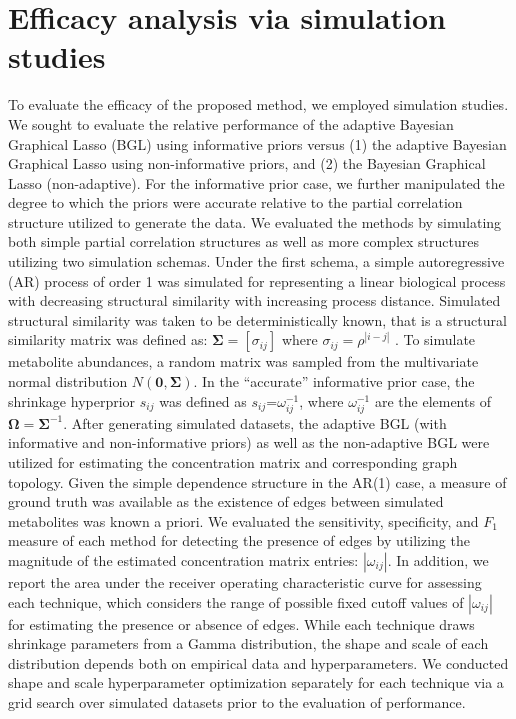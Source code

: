 \section{Efficacy analysis via simulation studies}
To evaluate the efficacy of the proposed method, we employed simulation studies. We sought to evaluate the relative performance of the adaptive Bayesian Graphical Lasso (BGL) using informative priors versus (1) the adaptive Bayesian Graphical Lasso using non-informative priors, and (2) the Bayesian Graphical Lasso (non-adaptive). For the informative prior case, we further manipulated the degree to which the priors were accurate relative to the partial correlation structure utilized to generate the data. We evaluated the methods by simulating both simple partial correlation structures as well as more complex structures utilizing two simulation schemas. Under the first schema, a simple autoregressive (AR) process of order 1 was simulated for representing a linear biological process with decreasing structural similarity with increasing process distance. Simulated structural similarity was taken to be deterministically known, that is a structural similarity matrix was defined as: $\boldsymbol{\Sigma} = \left[\sigma_{ij}\right]$ where $\sigma_{ij}=\rho^{|i-j|}$ . To simulate metabolite abundances, a random matrix was sampled from the multivariate normal distribution $N(\textbf{0},\boldsymbol{\Sigma})$. In the “accurate” informative prior case, the shrinkage hyperprior $s_{ij}$ was defined as $s_{ij}$=$\omega_{ij}^{-1}$, where $\omega_{ij}^{-1}$ are the elements of $\boldsymbol{\Omega}=\boldsymbol{\Sigma}^{-1}$. After generating simulated datasets, the adaptive BGL (with informative and non-informative priors) as well as the non-adaptive BGL were utilized for estimating the concentration matrix and corresponding graph topology. Given the simple dependence structure in the AR(1) case, a measure of ground truth was available as the existence of edges between simulated metabolites was known a priori. We evaluated the sensitivity, specificity, and $F_1$ measure of each method for detecting the presence of edges by utilizing the magnitude of the estimated concentration matrix entries: $|\omega_{ij}|$. In addition, we report the area under the receiver operating characteristic curve for assessing each technique, which considers the range of possible fixed cutoff values of $|\omega_{ij}|$ for estimating the presence or absence of edges. While each technique draws shrinkage parameters from a Gamma distribution, the shape and scale of each distribution depends both on empirical data and hyperparameters. We conducted shape and scale hyperparameter optimization separately for each technique via a grid search over simulated datasets prior to the evaluation of performance.

